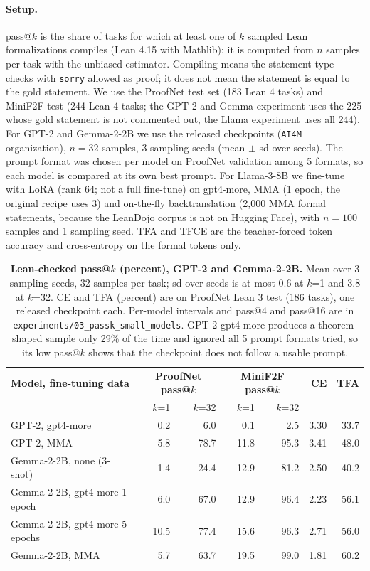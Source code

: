 \documentclass{article} %
\begin{document}
\paragraph{Setup.} pass@$k$ is the share of tasks for which at least one of $k$ sampled Lean formalizations compiles (Lean 4.15 with Mathlib); it is computed from $n$ samples per task with the unbiased estimator. Compiling means the statement type-checks with \texttt{sorry} allowed as proof; it does not mean the statement is equal to the gold statement. We use the ProofNet test set (183 Lean 4 tasks) and MiniF2F test (244 Lean 4 tasks; the GPT-2 and Gemma experiment uses the 225 whose gold statement is not commented out, the Llama experiment uses all 244). For GPT-2 and Gemma-2-2B we use the released checkpoints (\texttt{AI4M} organization), $n=32$ samples, 3 sampling seeds (mean $\pm$ sd over seeds). The prompt format was chosen per model on ProofNet validation among 5 formats, so each model is compared at its own best prompt. For Llama-3-8B we fine-tune with LoRA (rank 64; not a full fine-tune) on gpt4-more, MMA (1 epoch, the original recipe uses 3) and on-the-fly backtranslation (2,000 MMA formal statements, because the LeanDojo corpus is not on Hugging Face), with $n=100$ samples and 1 sampling seed. TFA and TFCE are the teacher-forced token accuracy and cross-entropy on the formal tokens only.

\begin{table}[ht]
\centering
\small
\renewcommand{\arraystretch}{1.15}
\begin{tabular}{|l|r|r|r|r|r|r|}
\hline
\textbf{Model, fine-tuning data} & \multicolumn{2}{c|}{\textbf{ProofNet pass@$k$}} & \multicolumn{2}{c|}{\textbf{MiniF2F pass@$k$}} & \textbf{CE} & \textbf{TFA} \\
 & $k$=1 & $k$=32 & $k$=1 & $k$=32 & & \\
\hline
GPT-2, gpt4-more & 0.2 & 6.0 & 0.1 & 2.5 & 3.30 & 33.7 \\
GPT-2, MMA & 5.8 & 78.7 & 11.8 & 95.3 & 3.41 & 48.0 \\
\hline
Gemma-2-2B, none (3-shot) & 1.4 & 24.4 & 12.9 & 81.2 & 2.50 & 40.2 \\
Gemma-2-2B, gpt4-more 1 epoch & 6.0 & 67.0 & 12.9 & 96.4 & 2.23 & 56.1 \\
Gemma-2-2B, gpt4-more 5 epochs & 10.5 & 77.4 & 15.6 & 96.3 & 2.71 & 56.0 \\
Gemma-2-2B, MMA & 5.7 & 63.7 & 19.5 & 99.0 & 1.81 & 60.2 \\
\hline
\end{tabular}
\caption{\textbf{Lean-checked pass@$k$ (percent), GPT-2 and Gemma-2-2B.} Mean over 3 sampling seeds, 32 samples per task; sd over seeds is at most 0.6 at $k$=1 and 3.8 at $k$=32. CE and TFA (percent) are on ProofNet Lean 3 test (186 tasks), one released checkpoint each. Per-model intervals and pass@4 and pass@16 are in \texttt{experiments/03\_passk\_small\_models}. GPT-2 gpt4-more produces a theorem-shaped sample only 29\% of the time and ignored all 5 prompt formats tried, so its low pass@$k$ shows that the checkpoint does not follow a usable prompt.}
\label{table:passk_small}
\end{table}
\end{document}
